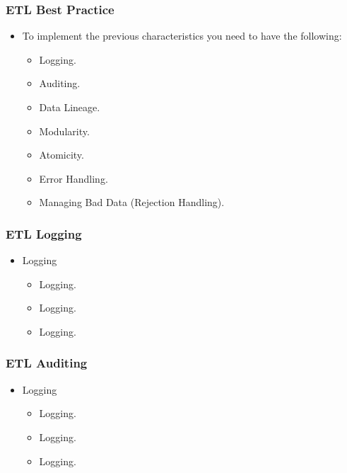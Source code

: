 \begin{frame}
    \frametitle{ETL Best Practice}
    \begin{itemize}[<+->]
        \item To implement the previous characteristics you need to have the following:
        \begin{itemize}[<+->]
            \item [\faCheckSquareO] Logging.

            \item [\faCheckSquareO] Auditing.

            \item [\faCheckSquareO] Data Lineage.

            \item [\faCheckSquareO] Modularity.

            \item [\faCheckSquareO] Atomicity.

            \item [\faCheckSquareO] Error Handling.

            \item [\faCheckSquareO] Managing Bad Data (Rejection Handling).
        \end{itemize}
    \end{itemize}
\end{frame}


\begin{frame}
    \frametitle{ETL Logging}
    \begin{itemize}[<+->]
        \item Logging
        \begin{itemize}[<+->]
            \item  Logging.
            \item  Logging.
            \item  Logging.


        \end{itemize}
    \end{itemize}
\end{frame}


\begin{frame}
    \frametitle{ETL Auditing}
    \begin{itemize}[<+->]
        \item Logging
        \begin{itemize}[<+->]
            \item  Logging.
            \item  Logging.
            \item  Logging.


        \end{itemize}
    \end{itemize}
\end{frame}

